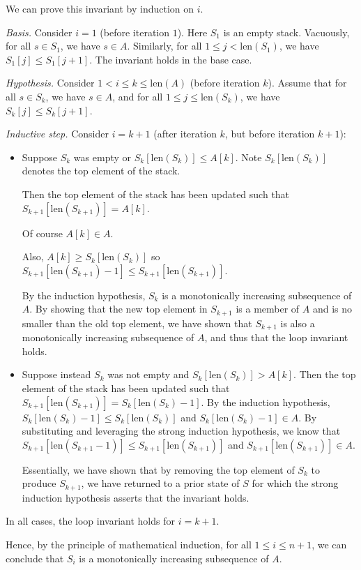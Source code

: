 \begin{enumerate}
\begin{solution}
We can prove this invariant by induction on $i$.

\textit{Basis. }Consider $i=1$ (before iteration $1$). Here $S_1$ is an empty stack. Vacuously, for all $s\in S_1$, we have $s\in A$. Similarly, for all $1\leq j<\text{len}(S_1)$, we have $S_1[j]\leq S_1[j+1]$. The invariant holds in the base case.

\textit{Hypothesis. }Consider $1<i\leq k\leq\text{len}(A)$ (before iteration $k$). Assume that for all $s\in S_k$, we have $s\in A$, and for all $1\leq j\leq\text{len}(S_k)$, we have $S_k[j]\leq S_k[j+1]$.

\textit{Inductive step. }Consider $i=k+1$ (after iteration $k$, but before iteration $k+1$):
\begin{itemize}
\item Suppose $S_k$ was empty or $S_k[\text{len}(S_k)]\leq A[k]$. Note $S_k[\text{len}(S_k)]$ denotes the top element of the stack.

Then the top element of the stack has been updated such that $S_{k+1}[\text{len}(S_{k+1})]=A[k]$.

Of course $A[k]\in A$.

Also, $A[k]\geq S_k[\text{len}(S_k)]$ so $S_{k+1}[\text{len}(S_{k+1})-1]\leq S_{k+1}[\text{len}(S_{k+1})]$. 

By the induction hypothesis, $S_k$ is a monotonically increasing subsequence of $A$. By showing that the new top element in $S_{k+1}$ is a member of $A$ and is no smaller than the old top element, we have shown that $S_{k+1}$ is also a monotonically increasing subsequence of $A$, and thus that the loop invariant holds.
\item Suppose instead $S_k$ was not empty and $S_k[\text{len}(S_k)]>A[k]$. Then the top element of the stack has been updated such that $S_{k+1}[\text{len}(S_{k+1})]=S_k[\text{len}(S_k)-1]$. By the induction hypothesis, $S_k[\text{len}(S_k)-1]\leq S_k[\text{len}(S_k)]$ and $S_k[\text{len}(S_k)-1]\in A$. By substituting and leveraging the strong induction hypothesis, we know that $S_{k+1}[\text{len}(S_{k+1}-1)]\leq S_{k+1}[\text{len}(S_{k+1})]$ and $S_{k+1}[\text{len}(S_{k+1})]\in A$.

Essentially, we have shown that by removing the top element of $S_k$ to produce $S_{k+1}$, we have returned to a prior state of $S$ for which the strong induction hypothesis asserts that the invariant holds.
\end{itemize}
In all cases, the loop invariant holds for $i=k+1$.

Hence, by the principle of mathematical induction, for all $1\leq i\leq n+1$, we can conclude that $S_i$ is a monotonically increasing subsequence of $A$. 


\end{solution}
\end{enumerate}
